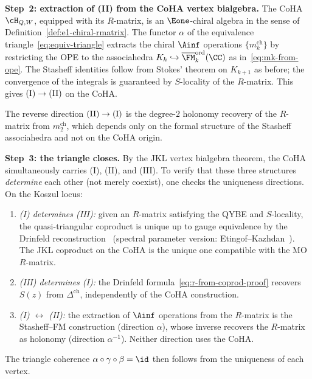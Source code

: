\begin{remark}
\smallskip
\noindent\textbf{Step~2: extraction of (II) from the CoHA
vertex bialgebra.}
The CoHA $\cH_{Q,W}$, equipped with its $R$-matrix, is an
$\Eone$-chiral algebra in the sense of
Definition~\ref{def:e1-chiral-rmatrix}. The functor $\alpha$
of the equivalence triangle~\eqref{eq:equiv-triangle}
extracts the chiral $\Ainf$ operations
$\{m_k^{\mathrm{ch}}\}$ by restricting the OPE to the
associahedra
$K_k \hookrightarrow
\overline{\FM}_k^{\mathrm{ord}}(\CC)$ as
in~\eqref{eq:mk-from-ope}. The Stasheff identities follow
from Stokes' theorem on $K_{k+1}$ as before; the
convergence of the integrals is guaranteed by
$S$-locality of the $R$-matrix. This gives
$\textup{(I)} \to \textup{(II)}$ on the CoHA.

The reverse direction $\textup{(II)} \to \textup{(I)}$ is the
degree-$2$ holonomy recovery of the $R$-matrix from
$m_2^{\mathrm{ch}}$, which depends only on the formal
structure of the Stasheff associahedra and not on the CoHA
origin.

\smallskip
\noindent\textbf{Step~3: the triangle closes.}
By the JKL vertex bialgebra theorem, the CoHA
simultaneously carries (I), (II), and (III). To verify that
these three structures \emph{determine} each other (not merely
coexist), one checks the uniqueness directions. On the Koszul
locus:
\begin{enumerate}[label=\textup{(\roman*)}]
\item \emph{(I) determines (III):} given an $R$-matrix
  satisfying the QYBE and $S$-locality, the quasi-triangular
  coproduct is unique up to gauge equivalence by the
  Drinfeld reconstruction~\cite{Drinfeld90}
  (spectral parameter version:
  Etingof--Kazhdan~\cite{EK96}). The JKL coproduct on the
  CoHA is the unique one compatible with the MO $R$-matrix.
\item \emph{(III) determines (I):} the Drinfeld
  formula~\eqref{eq:r-from-coprod-proof} recovers $S(z)$
  from $\Delta^{\mathrm{ch}}$, independently of the CoHA
  construction.
\item \emph{(I) $\leftrightarrow$ (II):} the extraction of
  $\Ainf$ operations from the $R$-matrix is the
  Stasheff--FM construction (direction $\alpha$), whose
  inverse recovers the $R$-matrix as holonomy (direction
  $\alpha^{-1}$). Neither direction uses the CoHA.
\end{enumerate}
The triangle coherence
$\alpha \circ \gamma \circ \beta = \id$ then follows from
the uniqueness of each vertex.


\end{remark}

